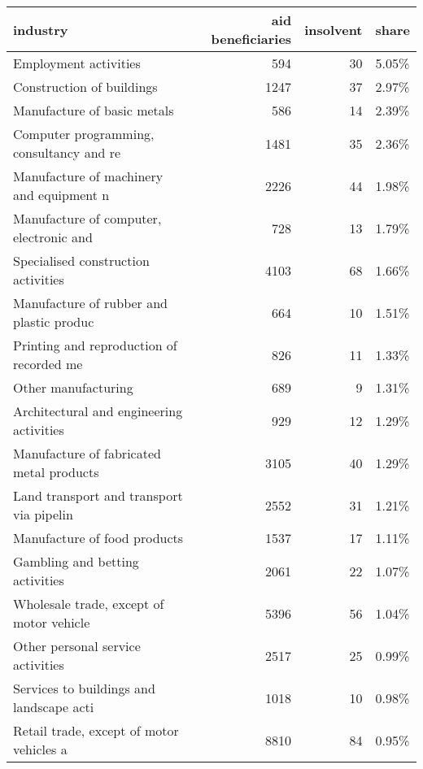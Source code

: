 \begin{tabular}{lrrl}
\toprule
                                industry &  aid beneficiaries &  insolvent & share \\
\midrule
                   Employment activities &                594 &         30 & 5.05\% \\
               Construction of buildings &               1247 &         37 & 2.97\% \\
             Manufacture of basic metals &                586 &         14 & 2.39\% \\
Computer programming, consultancy and re &               1481 &         35 & 2.36\% \\
Manufacture of machinery and equipment n &               2226 &         44 & 1.98\% \\
Manufacture of computer, electronic and  &                728 &         13 & 1.79\% \\
     Specialised construction activities &               4103 &         68 & 1.66\% \\
Manufacture of rubber and plastic produc &                664 &         10 & 1.51\% \\
Printing and reproduction of recorded me &                826 &         11 & 1.33\% \\
                     Other manufacturing &                689 &          9 & 1.31\% \\
Architectural and engineering activities &                929 &         12 & 1.29\% \\
Manufacture of fabricated metal products &               3105 &         40 & 1.29\% \\
Land transport and transport via pipelin &               2552 &         31 & 1.21\% \\
            Manufacture of food products &               1537 &         17 & 1.11\% \\
         Gambling and betting activities &               2061 &         22 & 1.07\% \\
Wholesale trade, except of motor vehicle &               5396 &         56 & 1.04\% \\
       Other personal service activities &               2517 &         25 & 0.99\% \\
Services to buildings and landscape acti &               1018 &         10 & 0.98\% \\
Retail trade, except of motor vehicles a &               8810 &         84 & 0.95\% \\

\end{tabular}
